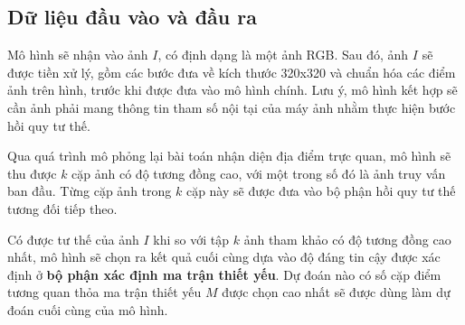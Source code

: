 \subsection{Dữ liệu đầu vào và đầu ra}
Mô hình sẽ nhận vào ảnh $I$, có định dạng là một ảnh RGB. Sau đó, ảnh $I$ sẽ được tiền xử lý, gồm các bước đưa về kích thước 320x320 và chuẩn hóa các điểm ảnh trên hình, trước khi được đưa vào mô hình chính. Lưu ý, mô hình kết hợp sẽ cần ảnh phải mang thông tin tham số nội tại của máy ảnh nhằm thực hiện bước hồi quy tư thế. 

Qua quá trình mô phỏng lại bài toán nhận diện địa điểm trực quan, mô hình sẽ thu được $k$ cặp ảnh có độ tương đồng cao, với một trong số đó là ảnh truy vấn ban đầu. Từng cặp ảnh trong $k$ cặp này sẽ được đưa vào bộ phận hồi quy tư thế tương đối tiếp theo.

Có được tư thế của ảnh $I$ khi so với tập $k$ ảnh tham khảo có độ tương đồng cao nhất, mô hình sẽ chọn ra kết quả cuối cùng dựa vào độ đáng tin cậy được xác định ở \textbf{bộ phận xác định ma trận thiết yếu}. Dự đoán nào có số cặp điểm tương quan thỏa ma trận thiết yếu $M$ được chọn cao nhất sẽ được dùng làm dự đoán cuối cùng của mô hình.

